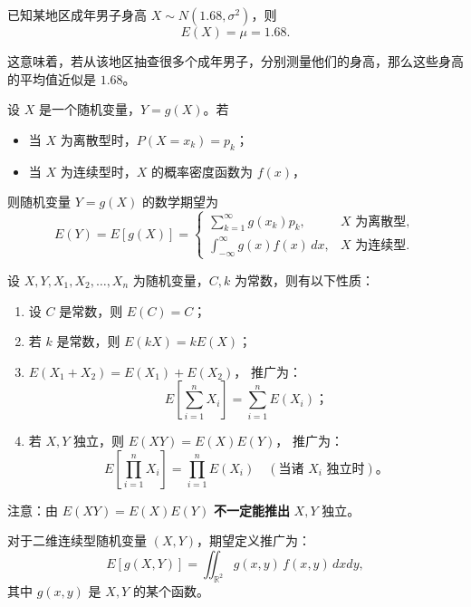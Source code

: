 \begin{example}
已知某地区成年男子身高 \(X \sim N(1.68, \sigma^2)\)，则
\[
E(X)=\mu=1.68.
\]

这意味着，若从该地区抽查很多个成年男子，分别测量他们的身高，那么这些身高的平均值近似是 \(1.68\)。
\end{example}
\begin{definition}[随机变量函数的数学期望]
设 \(X\) 是一个随机变量，\(Y=g(X)\)。若

\begin{itemize}
  \item 当 \(X\) 为离散型时，\(P(X=x_k)=p_k\)；
  \item 当 \(X\) 为连续型时，\(X\) 的概率密度函数为 \(f(x)\)，
\end{itemize}

则随机变量 \(Y=g(X)\) 的数学期望为
\[
E(Y)=E[g(X)]=
\begin{cases}
  \displaystyle \sum_{k=1}^{\infty} g(x_k)p_k, & X\text{ 为离散型},\\[1em]
  \displaystyle \int_{-\infty}^{\infty} g(x)f(x)\,dx, & X\text{ 为连续型}.
\end{cases}
\]
\end{definition}
\begin{theorem}[数学期望的性质]
设 \(X, Y, X_1, X_2, \ldots, X_n\) 为随机变量，\(C, k\) 为常数，则有以下性质：

\begin{enumerate}
  \item 设 \(C\) 是常数，则 \(E(C)=C\)；
  
  \item 若 \(k\) 是常数，则 \(E(kX)=kE(X)\)；
  
  \item \(E(X_1+X_2)=E(X_1)+E(X_2)\)，  
  推广为：
  \[
  E\!\left[\sum_{i=1}^{n} X_i\right]=\sum_{i=1}^{n}E(X_i)；
  \]
  
  \item 若 \(X, Y\) 独立，则 \(E(XY)=E(X)E(Y)\)，  
  推广为：
  \[
  E\!\left[\prod_{i=1}^{n} X_i\right]
  =\prod_{i=1}^{n}E(X_i)\quad (\text{当诸 }X_i\text{ 独立时})。
  \]
\end{enumerate}

\begin{remark}
注意：由 \(E(XY)=E(X)E(Y)\) \textbf{不一定能推出} \(X,Y\) 独立。
\end{remark}
\end{theorem}
\begin{definition}[二维随机变量的期望定义]
对于二维连续型随机变量 $(X,Y)$，期望定义推广为：
\[
E[g(X,Y)] = \iint_{\mathbb{R}^2} g(x,y)\, f(x,y)\, dxdy,
\]
其中 $g(x,y)$ 是 $X,Y$ 的某个函数。
\end{definition}

